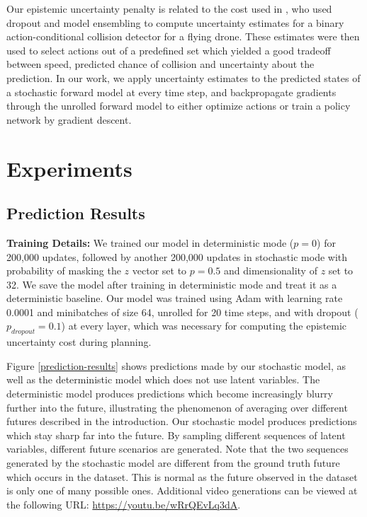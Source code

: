 \documentclass{article} %
\begin{document}
Our epistemic uncertainty penalty is related to the cost used in \citep{Kahn2017}, who used dropout and model ensembling to compute uncertainty estimates for a binary action-conditional collision detector for a flying drone. These estimates were then used to select actions out of a predefined set which yielded a good tradeoff between speed, predicted chance of collision and uncertainty about the prediction. In our work, we apply uncertainty estimates to the predicted states of a stochastic forward model at every time step, and backpropagate gradients through the unrolled forward model to either optimize actions or train a policy network by gradient descent.




    \section{Experiments}

    \subsection{Prediction Results}

    \textbf{Training Details:} We trained our model in deterministic mode ($p=0$) for 200,000 updates, followed by another 200,000 updates in stochastic mode with probability of masking the $z$ vector set to $p=0.5$ and dimensionality of $z$ set to 32.
    We save the model after training in deterministic mode and treat it as a deterministic baseline.
    Our model was trained using Adam \citep{ADAM} with learning rate 0.0001 and minibatches of size 64, unrolled for 20 time steps, and with dropout ($p_{dropout}=0.1$) at every layer, which was necessary for computing the epistemic uncertainty cost during planning.

    Figure \ref{prediction-results} shows predictions made by our stochastic model, as well as the deterministic model which does not use latent variables.
    The deterministic model produces predictions which become increasingly blurry further into the future, illustrating the phenomenon of averaging over different futures described in the introduction. Our stochastic model produces predictions which stay sharp far into the future.
    By sampling different sequences of latent variables, different future scenarios are generated.
    Note that the two sequences generated by the stochastic model are different from the ground truth future which occurs in the dataset.
    This is normal as the future observed in the dataset is only one of many possible ones.
    Additional video generations can be viewed at the following URL: \url{https://youtu.be/wRrQEvLq3dA}.
\end{document}
